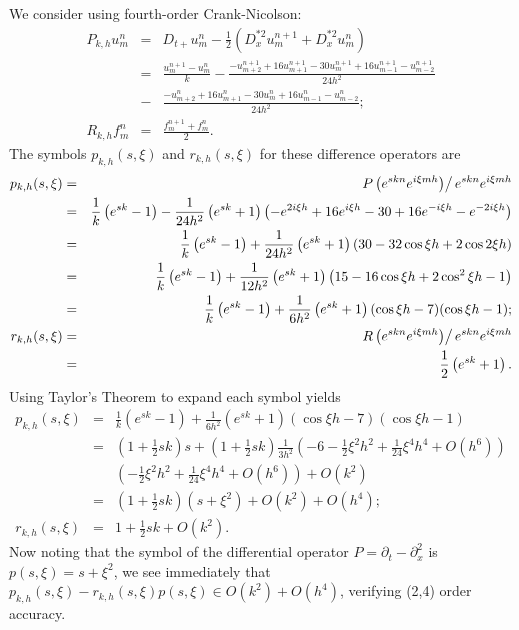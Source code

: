 \documentclass{article}
\begin{document}
\begin{enumerate}
We consider using fourth-order Crank-Nicolson:
\begin{eqnarray*}
P_{k,h} u^n_m
& = & D_{t+} u^n_m - \frac{1}{2} \left( D_x^{*2} u^{n+1}_m + D_x^{*2} u^n_m \right) \\
& = & \frac{u^{n+1}_m - u^n_m}{k}
    - \frac{-u^{n+1}_{m+2} + 16u^{n+1}_{m+1} - 30u^{n+1}_m + 16u^{n+1}_{m-1} - u^{n+1}_{m-2}}{24h^2} \\
& - & \frac{-u^n_{m+2} + 16u^n_{m+1} - 30u^n_m + 16u^n_{m-1} - u^n_{m-2}}{24h^2}; \\
R_{k,h} f^n_m & = & \frac{f^{n+1}_m + f^n_m}{2}.
\end{eqnarray*}
The symbols \(p_{k,h}(s,\xi)\) and \(r_{k,h}(s,\xi)\) for these difference operators are
\begin{eqnarray*}
p_{k,h}(s,\xi)
& = & \left. P \left( e^{skn} e^{i\xi mh} \right) \right/ e^{skn} e^{i\xi mh} \\
& = & \frac{1}{k} \left( e^{sk} - 1 \right)
    - \frac{1}{24h^2} \left( e^{sk} + 1 \right) \left( -e^{2i\xi h} + 16e^{i\xi h} - 30 + 16e^{-i\xi h} - e^{-2i\xi h} \right) \\
& = & \frac{1}{k} \left( e^{sk} - 1 \right)
    + \frac{1}{24h^2} \left( e^{sk} + 1 \right) \left( 30 - 32 \cos \xi h + 2 \cos 2\xi h \right) \\
& = & \frac{1}{k} \left( e^{sk} - 1 \right)
    + \frac{1}{12h^2} \left( e^{sk} + 1 \right) \left( 15 - 16 \cos \xi h + 2 \cos^2 \xi h - 1 \right) \\
& = & \frac{1}{k} \left( e^{sk} - 1 \right)
    + \frac{1}{6h^2} \left( e^{sk} + 1 \right) (\cos \xi h - 7)(\cos \xi h - 1); \\
r_{k,h}(s,\xi)
& = & \left. R \left( e^{skn} e^{i\xi mh} \right) \right/ e^{skn} e^{i\xi mh} \\
& = & \frac{1}{2} \left( e^{sk} + 1 \right).
\end{eqnarray*}
Using Taylor's Theorem to expand each symbol yields
\begin{eqnarray*}
p_{k,h}(s,\xi)
& = & \frac{1}{k} \left( e^{sk} - 1 \right)
    + \frac{1}{6h^2} \left( e^{sk} + 1 \right) (\cos \xi h - 7)(\cos \xi h - 1) \\
& = & \left( 1 + \frac{1}{2} sk \right) s
    + \left( 1 + \frac{1}{2} sk \right) \frac{1}{3h^2} \left( -6 - \frac{1}{2} \xi^2 h^2 + \frac{1}{24} \xi^4 h^4 + O(h^6) \right) \\
&   & \left( -\frac{1}{2} \xi^2 h^2 + \frac{1}{24} \xi^4 h^4 + O(h^6) \right)
    + O(k^2) \\
& = & \left( 1 + \frac{1}{2} sk \right) \left( s + \xi^2 \right) + O(k^2) + O(h^4); \\
r_{k,h}(s,\xi)
& = & 1 + \frac{1}{2} sk + O(k^2).
\end{eqnarray*}
Now noting that the symbol of the differential operator \(P = \partial_t - \partial_x^2\) is \(p(s,\xi) = s + \xi^2\), we see immediately that \(p_{k,h}(s,\xi) - r_{k,h}(s,\xi) p(s,\xi) \in O(k^2) + O(h^4)\), verifying (2,4) order accuracy.


\end{enumerate}
\end{document}
